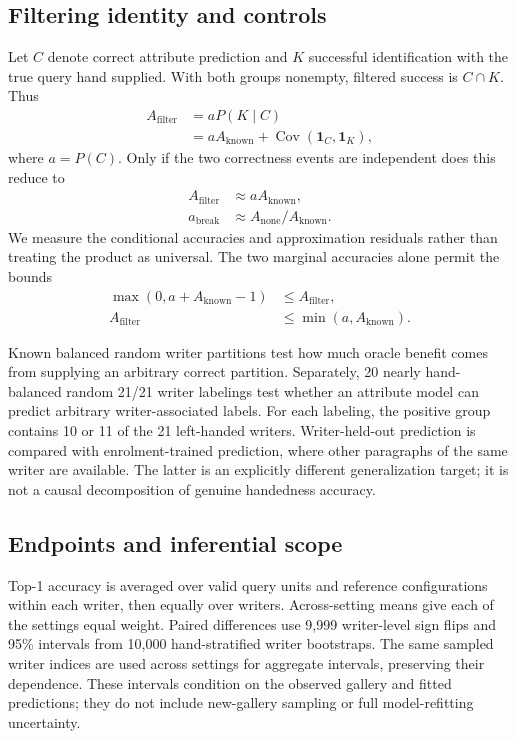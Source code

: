 \documentclass[5p,times,twocolumn,final,numbers,sort&compress]{elsarticle}
\begin{document}
\subsection{Filtering identity and controls}
\label{sec:identity}
Let $C$ denote correct attribute prediction and $K$ successful identification with the true query hand supplied. With both groups nonempty, filtered success is $C\cap K$. Thus
\begin{align}
 A_{\mathrm{filter}}&=aP(K\mid C)\nonumber\\
 &=aA_{\mathrm{known}}+\operatorname{Cov}(\mathbf1_C,\mathbf1_K),
 \label{eq:exact}
\end{align}
where $a=P(C)$. Only if the two correctness events are independent does this reduce to
\begin{equation}
 \begin{aligned}
 A_{\mathrm{filter}}&\approx aA_{\mathrm{known}},\\
 a_{\mathrm{break}}&\approx A_{\mathrm{none}}/A_{\mathrm{known}}.
 \end{aligned}
 \label{eq:approx}
\end{equation}
We measure the conditional accuracies and approximation residuals rather than treating the product as universal. The two marginal accuracies alone permit the bounds
\begin{equation}
 \begin{aligned}
 \max(0,a+A_{\mathrm{known}}-1)&\leq A_{\mathrm{filter}},\\
 A_{\mathrm{filter}}&\leq\min(a,A_{\mathrm{known}}).
 \end{aligned}
 \label{eq:bounds}
\end{equation}

Known balanced random writer partitions test how much oracle benefit comes from supplying an arbitrary correct partition. Separately, 20 nearly hand-balanced random 21/21 writer labelings test whether an attribute model can predict arbitrary writer-associated labels. For each labeling, the positive group contains 10 or 11 of the 21 left-handed writers. Writer-held-out prediction is compared with enrolment-trained prediction, where other paragraphs of the same writer are available. The latter is an explicitly different generalization target; it is not a causal decomposition of genuine handedness accuracy.

\subsection{Endpoints and inferential scope}
\label{sec:statistics}
Top-1 accuracy is averaged over valid query units and reference configurations within each writer, then equally over writers. Across-setting means give each of the \rSettings{} settings equal weight. Paired differences use 9,999 writer-level sign flips and 95\% intervals from 10,000 hand-stratified writer bootstraps. The same sampled writer indices are used across settings for aggregate intervals, preserving their dependence. These intervals condition on the observed gallery and fitted predictions; they do not include new-gallery sampling or full model-refitting uncertainty.
\end{document}

